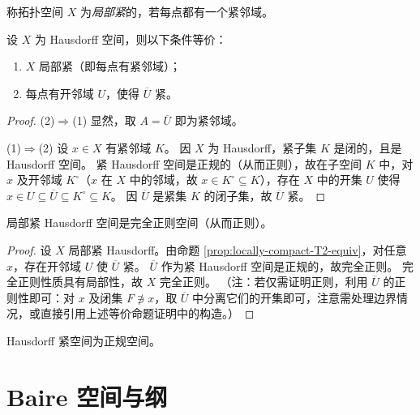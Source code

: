 \documentclass[lang=cn,a4paper,newtx,figureplace=section,tableplace=section]{elegantbook}
\begin{document}
\begin{definition}[局部紧空间]\label{def:locally-compact}
  称拓扑空间 $X$ 为\emph{局部紧}的，若每点都有一个紧邻域。
\end{definition}

\begin{proposition}\label{prop:locally-compact-T2-equiv}
  设 $X$ 为 Hausdorff 空间，则以下条件等价：
  \begin{enumerate}[(1)]
    \item $X$ 局部紧（即每点有紧邻域）；
    \item 每点有开邻域 $U$，使得 $\overline U$ 紧。
  \end{enumerate}
\end{proposition}
\begin{proof}
  (2)$\Rightarrow$(1) 显然，取 $A=\overline U$ 即为紧邻域。

  (1)$\Rightarrow$(2) 设 $x\in X$ 有紧邻域 $K$。
  因 $X$ 为 Hausdorff，紧子集 $K$ 是闭的，且是 Hausdorff 空间。
  紧 Hausdorff 空间是正规的（从而正则），故在子空间 $K$ 中，对 $x$ 及开邻域 $K^\circ$（$x$ 在 $X$ 中的邻域，故 $x\in K^\circ\subseteq K$），存在 $X$ 中的开集 $U$ 使得 $x\in U\subseteq \overline U \subseteq K^\circ \subseteq K$。
  因 $\overline U$ 是紧集 $K$ 的闭子集，故 $\overline U$ 紧。
\end{proof}

\begin{proposition}\label{prop:locally-compact-T2-regular}
  局部紧 Hausdorff 空间是完全正则空间（从而正则）。
\end{proposition}
\begin{proof}
  设 $X$ 局部紧 Hausdorff。由命题 \ref{prop:locally-compact-T2-equiv}，对任意 $x$，存在开邻域 $U$ 使 $\overline U$ 紧。
  $\overline U$ 作为紧 Hausdorff 空间是正规的，故完全正则。
  完全正则性质具有局部性，故 $X$ 完全正则。
  （注：若仅需证明正则，利用 $\overline U$ 的正则性即可：对 $x$ 及闭集 $F\not\ni x$，取 $\overline U$ 中分离它们的开集即可，注意需处理边界情况，或直接引用上述等价命题证明中的构造。）
\end{proof}

\begin{proposition}\label{prop:T2-compact-normal}
  Hausdorff 紧空间为正规空间。
\end{proposition}

\section{Baire 空间与纲}
\end{document}
